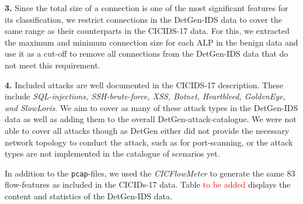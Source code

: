 \documentclass[runningheads]{llncs}
\begin{document}
\textbf{3.} Since the total size of a connection is one of the most significant features for its classification, we restrict connections in the DetGen-IDS data to cover the same range as their counterparts in the CICIDS-17 data. For this, we extracted the maximum and minimum connection size for each ALP in the benign data and use it as a cut-off to remove all connections from the DetGen-IDS data that do not meet this requirement.

\textbf{4.} Included attacks are well documented in the CICIDS-17 description. These include \textit{SQL-injections, SSH-brute-force, XSS, Botnet, Heartbleed, GoldenEye, and SlowLoris}. We aim to cover as many of these attack types in the DetGen-IDS data as well as adding them to the overall DetGen-attack-catalogue. We were not able to cover all attacks though as DetGen either did not provide the necessary network topology to conduct the attack, such as for port-scanning, or the attack types are not implemented in the catalogue of scenarios yet. 

In addition to the \texttt{pcap}-files, we used the \textit{CICFlowMeter} to generate the same 83 flow-features as included in the CICIDs-17 data. Table \textcolor{red}{to be added} displays the content and statistics of the DetGen-IDS data.
%
%
%
%
%
%
%
\end{document}
